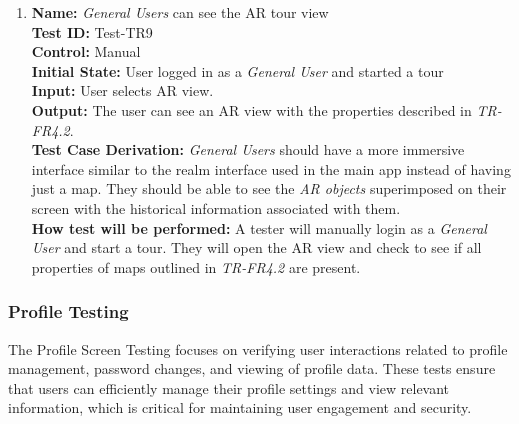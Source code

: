 \documentclass[12pt, titlepage]{article}
\begin{document}
\begin{enumerate}
    \item
    \textbf{Name:} \textit{General Users} can see the AR tour view \label{itm:Test-TR9} \\
    \textbf{Test ID:} Test-TR9 \\
    \textbf{Control:} Manual \\
    \textbf{Initial State:} User logged in as a \textit{General User} and started a tour \\
    \textbf{Input:} User selects AR view. \\
    \textbf{Output:} The user can see an AR view with the properties described in \textit{TR-FR4.2}. \\
    \textbf{Test Case Derivation:} \textit{General Users} should have a more immersive interface similar to the realm interface used in the main app instead of having just a map. They should be able to see the \textit{AR objects} superimposed on their screen with the historical information associated with them. \\
    \textbf{How test will be performed:} A tester will manually login as a \textit{General User} and start a tour. They will open the AR view and check to see if all properties of maps outlined in \textit{TR-FR4.2} are present.

\end{enumerate}

\subsubsection{Profile Testing}
\label{sec:profile_screen_testing}

The Profile Screen Testing focuses on verifying user interactions related to profile management, password changes, and viewing of profile data. These tests ensure that users can efficiently manage their profile settings and view relevant information, which is critical for maintaining user engagement and security.
\end{document}
